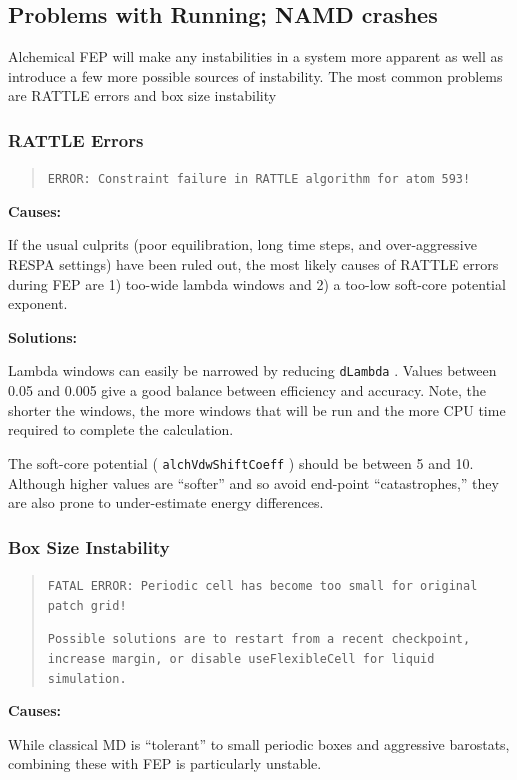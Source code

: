 \documentclass[9pt,tutorial]{Styling/livecoms}
\newcommand{\textInput}[1]{
  \texttt{#1}
}
\begin{document}
\subsection{Problems with Running; NAMD crashes}
Alchemical FEP will make any instabilities in a system more apparent as well as introduce a few more possible sources of instability. The most common problems are RATTLE errors and box size instability

\subsubsection{RATTLE Errors}
\begin{quote}
\texttt{ERROR: Constraint failure in RATTLE algorithm for atom 593!}
\end{quote}

\noindent\textbf{Causes:}

If the usual culprits (poor equilibration, long time steps, and over-aggressive RESPA settings) have been ruled out, the most likely causes of RATTLE errors during FEP are 1) too-wide lambda windows and 2) a too-low soft-core potential exponent.

\noindent\textbf{Solutions:}

Lambda windows can easily be narrowed by reducing \textInput{dLambda}. Values between 0.05 and 0.005 give a good balance between efficiency and accuracy.
Note, the shorter the windows, the more windows that will be run and the more CPU time required to complete the calculation.

The soft-core potential (\textInput{alchVdwShiftCoeff}) should be between 5 and 10. Although higher values are ``softer'' and so avoid end-point ``catastrophes,'' they are also prone to under-estimate energy differences.

\subsubsection{Box Size Instability}
\begin{quote}
\texttt{FATAL ERROR: Periodic cell has become too small for original patch grid!}

\texttt{Possible solutions are to restart from a recent checkpoint,
increase margin, or disable useFlexibleCell for liquid simulation.}
\end{quote}

\noindent\textbf{Causes:}

While classical MD is ``tolerant'' to small periodic boxes and aggressive barostats, combining these with FEP is particularly unstable.
\end{document}

